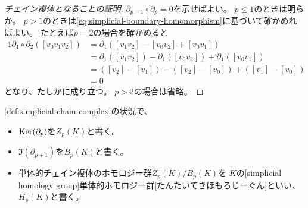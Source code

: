 \documentclass[report]{jlreq}
\begin{document}
\begin{proof}[チェイン複体となることの証明]
    $\partial_{p-1} \circ \partial_p = 0$を示せばよい。
    $p \le 1$のときは明らか。
    $p > 1$のときは\cref{eq:simplicial-boundary-homomorphism}に基づいて確かめればよい。
    たとえば$p = 2$の場合を確かめると
    \begin{alignat}{1}
        \partial_1 \circ \partial_2 ([v_0 v_1 v_2])
            &= \partial_1 ([v_1 v_2] - [v_0 v_2] + [v_0 v_1]) \\
            &= \partial_1 ([v_1 v_2]) - \partial_1([v_0 v_2]) + \partial_1([v_0 v_1]) \\
            &= ([v_2] - [v_1]) - ([v_2] - [v_0]) + ([v_1] - [v_0]) \\
            &= 0
    \end{alignat}
    となり、たしかに成り立つ。
    $p > 2$の場合は省略。
\end{proof}

\begin{definition}[単体的ホモロジー群]
    \cref{def:simplicial-chain-complex}の状況で、
    \begin{itemize}
        \item $\operatorname{\mathrm{Ker}}(\partial_p)$を$Z_p(K)$と書く。
        \item $\Im(\partial_{p+1})$を$B_p(K)$と書く。
        \item 単体的チェイン複体のホモロジー群$Z_p(K) / B_p(K)$を
            $K$の[simplicial homology group]{単体的ホモロジー群}[たんたいてきほもろじーぐん]といい、
            $H_p(K)$と書く。
    \end{itemize}
\end{definition}

\end{document}
